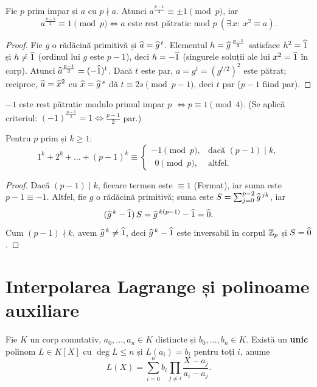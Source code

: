 \begin{propozitie}\label{prop:eulercrit}
Fie $p$ prim impar și $a$ cu $p\nmid a$. Atunci $a^{\frac{p-1}2}\equiv\pm1\pmod p$, iar
\[
a^{\frac{p-1}{2}}\equiv1\pmod p\iff a\text{ este rest pătratic mod }p\ (\exists\,x:\ x^2\equiv a).
\]
\end{propozitie}

\begin{proof}
Fie $g$ o rădăcină primitivă și $\widehat{a}=\widehat{g}^{\,t}$. Elementul $h=\widehat{g}^{\,\frac{p-1}2}$ satisface $h^2=\widehat{1}$ și $h\neq\widehat{1}$ (ordinul lui $g$ este $p-1$), deci $h=-\widehat{1}$ (singurele soluții ale lui $x^2=\widehat{1}$ în corp). Atunci $\widehat{a}^{\frac{p-1}2}=(-\widehat{1})^t$. Dacă $t$ este par, $a=g^t=(g^{t/2})^2$ este pătrat; reciproc, $\widehat{a}=\widehat{x}^2$ cu $\widehat{x}=\widehat{g}^{\,s}$ dă $t\equiv 2s\pmod{p-1}$, deci $t$ par ($p-1$ fiind par).
\end{proof}

\begin{corolar}\label{cor:minus1}
$-1$ este rest pătratic modulo primul impar $p$ $\iff p\equiv1\pmod4$. (Se aplică criteriul: $(-1)^{\frac{p-1}2}=1\iff\frac{p-1}2$ par.)
\end{corolar}

\begin{propozitie}\label{prop:sumeputeri}
Pentru $p$ prim și $k\ge 1$:
\[
1^k+2^k+\dots+(p-1)^k\equiv
\begin{cases}
-1\pmod p,&\text{dacă }(p-1)\mid k,\\
\ \ 0\pmod p,&\text{altfel}.
\end{cases}
\]
\end{propozitie}

\begin{proof}
Dacă $(p-1)\mid k$, fiecare termen este $\equiv1$ (Fermat), iar suma este $p-1\equiv-1$. Altfel, fie $g$ o rădăcină primitivă; suma este $S=\sum_{j=0}^{p-2}\widehat{g}^{\,jk}$, iar
\[
(\widehat{g}^{\,k}-\widehat{1})\,S=\widehat{g}^{\,k(p-1)}-\widehat{1}=\widehat{0}.
\]
Cum $(p-1)\nmid k$, avem $\widehat{g}^{\,k}\neq\widehat{1}$, deci $\widehat{g}^{\,k}-\widehat{1}$ este inversabil în corpul $\mathbb{Z}_p$ și $S=\widehat{0}$.
\end{proof}

\section{Interpolarea Lagrange și polinoame auxiliare}

\begin{teorema}\label{teo:lagrangeint}
Fie $K$ un corp comutativ, $a_0,\dots,a_n\in K$ distincte și $b_0,\dots,b_n\in K$. Există un \textbf{unic} polinom $L\in K[X]$ cu $\deg L\le n$ și $L(a_i)=b_i$ pentru toți $i$, anume
\[
L(X)=\sum_{i=0}^{n}b_i\prod_{j\neq i}\frac{X-a_j}{a_i-a_j}.
\]
\end{teorema}

